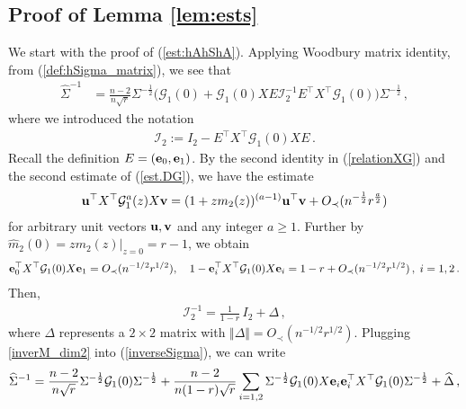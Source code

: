 \documentclass[12pt]{article}
\numberwithin{equation}{section}
\theoremstyle{remark}
\newcommand{\1}{{\rm 1}\kern-0.24em{\rm I}}
\begin{document}
\begin{appendices}
\subsection{Proof of Lemma \ref{lem:ests}}
We start with the proof of (\ref{est:hAhShA}). 
Applying Woodbury matrix identity, from (\ref{def:hSigma_matrix}),  we see that 
\begin{align} \label{inverseSigma}
\widehat \Sigma ^{-1}&= \frac{n-2}{n\sqrt r} \Sigma^{-\frac 12} \Big(\mathcal{G}_1(0) + \mathcal{G}_1(0) X  {E}  \mathcal{I}_{2}^{-1} {E}^{\top} {X}^{\top}  \mathcal{G}_1(0) \Big) \Sigma^{-\frac 12}\,,
\end{align}
where we introduced the notation 
\begin{align*}
\mathcal{I}_{2}:=I_2 - {E}^{\top} {X}^{\top}    \mathcal{G}_1(0)  X{E}\,. 
\end{align*}
Recall the definition ${E}= ({\bf e}_0, {\bf e}_1)$. 
 By the second identity in (\ref{relationXG}) and the second  estimate of (\ref{est.DG}), we have the estimate
 \begin{align}\label{2021051401}
{\bf u}^{\top} {X}^{\top}  \mathcal{G}_1^{a}(z){X} {\bf v}= (1+zm_2(z))^{(a-1)}
{\bf u}^{\top}  {\bf v} + O_\prec(n^{-\frac 12} r^{\frac {a}{2} })
 \end{align} 
 for arbitrary unit vectors ${\bf u}, {\bf v}$ and any integer $a\geq 1$. Further by $\widehat m_2(0) =zm_2(z)\Big|_{z=0}=r-1 $,  we obtain
\begin{align*}
{\bf e}_0^{\top}{{X}}^{\top}    \mathcal{G}_1(0)  {X}{\bf e}_1= O_\prec(n^{-1/2}r^{1/2}),\quad 
1- {\bf e}_i^{\top} {{X}}^{\top}   \mathcal{G}_1(0)  {X}  {\bf e}_i  = 1- r + O_\prec(n^{-1/2}r^{1/2})\,, \; i=1,2\,.
\end{align*}
Then, 
\begin{align} \label{inverM_dim2}
 \mathcal{I}_2^{-1} = 
\frac{1}{1-r} \, I_2 + \Delta\,,
\end{align}
where $ \Delta$ represents a $2\times 2$ matrix with $\Vert \Delta \Vert =O_\prec(n^{-1/2}r^{1/2}) $. Plugging \eqref{inverM_dim2} into (\ref{inverseSigma}), we can write 
\begin{align}
\widehat \Sigma^{-1} = \frac{n-2}{n\sqrt r}  \Sigma^{-\frac 12}\mathcal{G}_1(0)  \Sigma^{-\frac 12}+ \frac{n-2}{n(1-r)\sqrt r} \sum_{i=1,2}  \Sigma^{-\frac 12} \mathcal{G}_1(0){X}{\bf e}_i {\bf e}_i^{\top} {X}^{\top} \mathcal{G}_1(0)  \Sigma^{-\frac 12} +\widehat \Delta\,, \label{031501}

\end{align}
\end{appendices}
\end{document}
